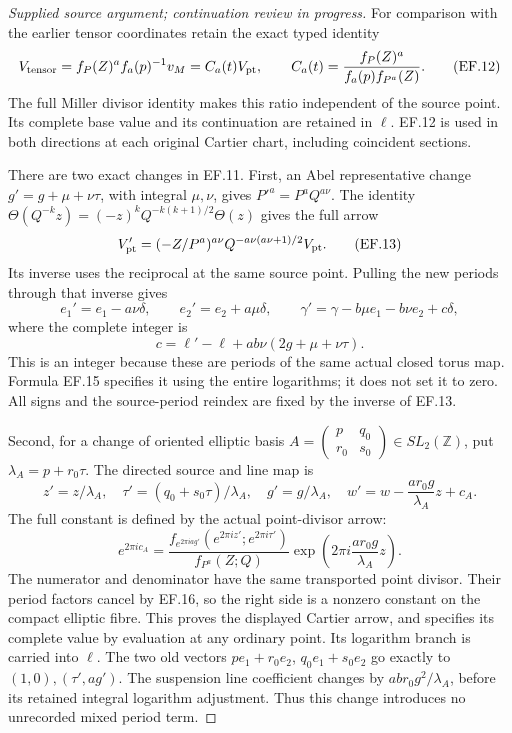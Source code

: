 \begin{proof}[Supplied source argument; continuation review in progress]
For comparison with the earlier tensor coordinates retain the exact
typed identity
\[
 V_{\rm tensor}=f_P(Z)^a f_a(p)^{-1}v_M
       =C_a(t)V_{\rm pt},\qquad
 C_a(t)=\frac{f_P(Z)^a}{f_a(p)f_{P^a}(Z)}.
 \tag{EF.12}
\]
The full Miller divisor identity makes this ratio independent of the
source point. Its complete base value and its continuation are retained
in \(\ell\). EF.12 is used in both directions at each original
Cartier chart, including coincident sections.

There are two exact changes in EF.11. First, an Abel representative
change \(g'=g+\mu+\nu\tau\), with integral \(\mu,\nu\), gives
\(P'^a=P^aQ^{a\nu}\). The identity
\(\Theta(Q^{-k}z)=(-z)^kQ^{-k(k+1)/2}\Theta(z)\) gives the full arrow
\[
 V_{\rm pt}'=(-Z/P^a)^{a\nu}
            Q^{-a\nu(a\nu+1)/2}V_{\rm pt}.
 \tag{EF.13}
\]
Its inverse uses the reciprocal at the same source point. Pulling the
new periods through that inverse gives
\[
 e_1'=e_1-a\nu\delta,\qquad
 e_2'=e_2+a\mu\delta,\qquad
 \gamma'=\gamma-b\mu e_1-b\nu e_2+c\delta,
 \tag{EF.14}
\]
where the complete integer is
\[
 c=\ell'-\ell+ab\nu(2g+\mu+\nu\tau).
 \tag{EF.15}
\]
This is an integer because these are periods of the same actual closed
torus map. Formula EF.15 specifies it using the entire logarithms; it
does not set it to zero. All signs and the source-period reindex are
fixed by the inverse of EF.13.

Second, for a change of oriented elliptic basis
\(A=\left(\begin{smallmatrix}p&q_0\\r_0&s_0\end{smallmatrix}\right)
\in SL_2(\mathbb Z)\), put \(\lambda_A=p+r_0\tau\). The directed
source and line map is
\[
 z'=z/\lambda_A,\quad \tau'=(q_0+s_0\tau)/\lambda_A,
 \quad g'=g/\lambda_A,\quad
 w'=w-\frac{a r_0g}{\lambda_A}z+c_A.
 \tag{EF.16}
\]
The full constant is defined by the actual point-divisor arrow:
\[
 e^{2\pi i c_A}=
 \frac{f_{e^{2\pi iag'}}(e^{2\pi iz'};e^{2\pi i\tau'})}
      {f_{P^a}(Z;Q)}
 \exp\!\left(2\pi i\frac{a r_0g}{\lambda_A}z\right).
 \tag{EF.17}
\]
The numerator and denominator have the same transported point divisor.
Their period factors cancel by EF.16, so the right side is a nonzero
constant on the compact elliptic fibre. This proves the displayed
Cartier arrow, and specifies its complete value by evaluation at any
ordinary point. Its logarithm branch is carried into \(\ell\).
The two old vectors \(p e_1+r_0e_2\), \(q_0e_1+s_0e_2\) go
exactly to \((1,0),(\tau',ag')\). The suspension line coefficient
changes by \(ab r_0g^2/\lambda_A\), before its retained integral
logarithm adjustment. Thus this change introduces no unrecorded mixed
period term.


\end{proof}
